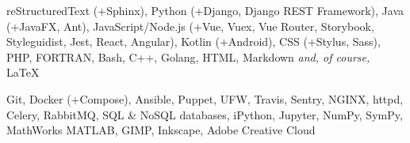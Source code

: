 
\sectiondescription
{
reStructuredText (+Sphinx),
Python (+Django, Django REST Framework),
Java (+JavaFX, Ant),
JavaScript/Node.js (+Vue, Vuex, Vue Router, Storybook, Styleguidist, Jest, React, Angular),
Kotlin (+Android),
CSS (+Stylus, Sass),
PHP, FORTRAN,
Bash, C++, Golang,
HTML, Markdown
\textit{and, of course,} {\selectfont\LaTeX}
}

\sectiondescription
{
Git,
Docker (+Compose),
Ansible, Puppet, UFW,
Travis, Sentry,
NGINX, httpd, Celery, RabbitMQ, SQL \& NoSQL databases,
iPython, Jupyter, NumPy, SymPy, MathWorks MATLAB,
GIMP, Inkscape, Adobe Creative Cloud
}
